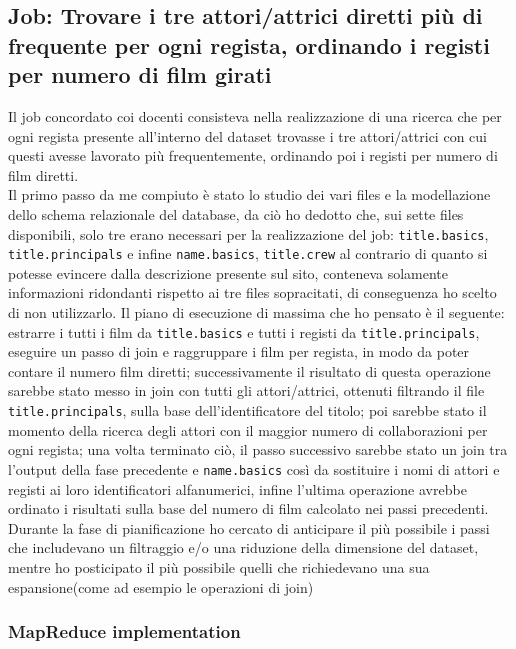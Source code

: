 \documentclass[hidelinks]{article}
\begin{document}
\subsection{Job: Trovare i tre attori/attrici diretti più di frequente per ogni regista, ordinando i registi per numero di film girati}

Il job concordato coi docenti consisteva nella realizzazione di una ricerca che per ogni regista presente all'interno del dataset trovasse i tre attori/attrici con cui questi avesse lavorato più frequentemente, ordinando poi i registi per numero di film diretti.\\
Il primo passo da me compiuto è stato lo studio dei vari files e la modellazione dello schema relazionale del database, da ciò ho dedotto che, sui sette files disponibili, solo tre erano necessari per la realizzazione del job: \texttt{title.basics}, \texttt{title.principals} e infine \texttt{name.basics}, \texttt{title.crew} al contrario di quanto si potesse evincere dalla descrizione presente sul sito, conteneva solamente informazioni ridondanti rispetto ai tre files sopracitati, di conseguenza ho scelto di non utilizzarlo.
Il piano di esecuzione di massima che ho pensato è il seguente: estrarre i tutti i film da \texttt{title.basics} e tutti i registi da \texttt{title.principals}, eseguire un passo di join e raggruppare i film per regista, in modo da poter contare il numero film diretti; successivamente il risultato di questa operazione sarebbe stato messo in join con tutti gli attori/attrici, ottenuti filtrando il file \texttt{title.principals}, sulla base dell'identificatore del titolo; poi sarebbe stato il momento della ricerca degli attori con il maggior numero di collaborazioni per ogni regista; una volta terminato ciò, il passo successivo sarebbe stato un join tra l'output della fase precedente e \texttt{name.basics} così da sostituire i nomi di attori e registi ai loro identificatori alfanumerici, infine l'ultima operazione avrebbe ordinato i risultati sulla base del numero di
film calcolato nei passi precedenti.\\
Durante la fase di pianificazione ho cercato di anticipare il più possibile i passi che includevano un filtraggio e/o una riduzione della dimensione del dataset, mentre ho posticipato il più possibile quelli che richiedevano una sua espansione(come ad esempio le operazioni di join) 

\subsubsection{MapReduce implementation}
\end{document}
